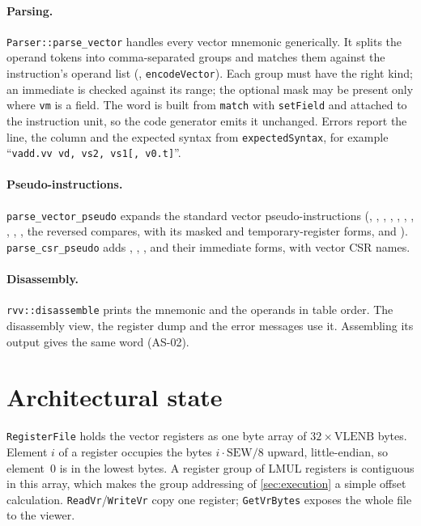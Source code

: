 \documentclass[11pt]{article}
\begin{document}
\paragraph{Parsing.} \texttt{Parser::parse\_vector} handles every vector mnemonic generically. It
splits the operand tokens into comma-separated groups and matches them against the
instruction's operand list (, \texttt{encodeVector}). Each group must have the
right kind; an immediate is checked against its range; the optional mask may be present only
where \texttt{vm} is a field. The word is built from \texttt{match} with \texttt{setField} and
attached to the instruction unit, so the code generator emits it unchanged. Errors report the
line, the column and the expected syntax from \texttt{expectedSyntax}, for example
``\texttt{vadd.vv vd, vs2, vs1[, v0.t]}''.

\paragraph{Pseudo-instructions.} \texttt{parse\_vector\_pseudo} expands the standard vector
pseudo-instructions (, , , ,
, , , , , ,
the reversed compares,  with its masked and temporary-register forms, and
). \texttt{parse\_csr\_pseudo} adds , , ,
 and their immediate forms, with vector CSR names.

\paragraph{Disassembly.} \texttt{rvv::disassemble} prints the mnemonic and the operands in table
order. The disassembly view, the register dump and the error messages use it. Assembling its
output gives the same word (AS-02).

\section{Architectural state}\label{sec:state}

\texttt{RegisterFile} holds the vector registers as one byte array of $32\times\mathrm{VLENB}$
bytes. Element $i$ of a register occupies the bytes $i\cdot\mathrm{SEW}/8$ upward,
little-endian, so element~0 is in the lowest bytes. A register group of LMUL registers is
contiguous in this array, which makes the group addressing of
\cref{sec:execution} a simple offset calculation. \texttt{ReadVr}/\texttt{WriteVr} copy one
register; \texttt{GetVrBytes} exposes the whole file to the viewer.
\end{document}
